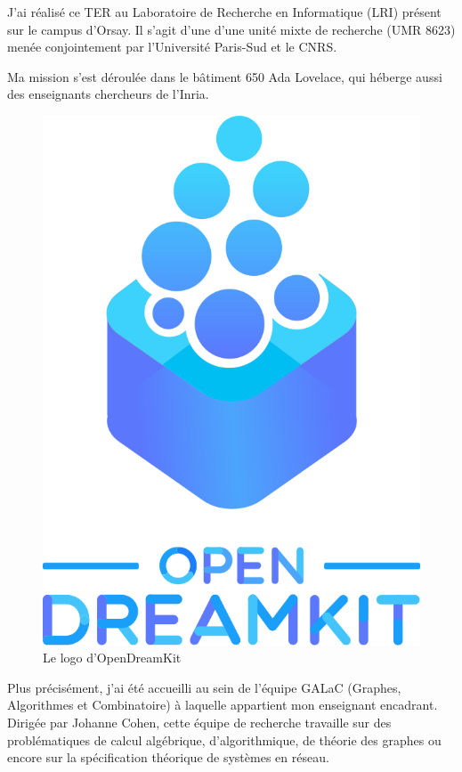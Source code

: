 \documentclass[12pt,a4paper]{report}
\begin{document}
J'ai réalisé ce TER au Laboratoire de Recherche en Informatique (LRI) présent sur le campus d'Orsay. Il s'agit d'une d'une unité mixte de recherche (UMR 8623) menée conjointement par l'Université Paris-Sud et le CNRS.

Ma mission s'est déroulée dans le bâtiment 650 Ada Lovelace, qui héberge aussi des enseignants chercheurs de l'Inria.

\begin{figure}[h]
	\centering
	\includegraphics[scale=0.2]{logo-odk.png}
	\caption{Le logo d'OpenDreamKit}
\end{figure}

Plus précisément, j'ai été accueilli au sein de l'équipe GALaC (Graphes, Algorithmes et Combinatoire) à laquelle appartient mon enseignant encadrant. Dirigée par Johanne Cohen, cette équipe de recherche travaille sur des problématiques de calcul algébrique, d'algorithmique, de théorie des graphes ou encore sur la spécification théorique de systèmes en réseau.
\end{document}
